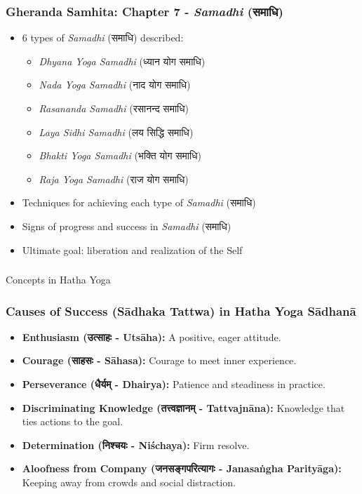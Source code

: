\begin{frame}[fragile]\frametitle{Gheranda Samhita: Chapter 7 - \textit{Samadhi} (समाधि)}
\begin{itemize}
    \item 6 types of \textit{Samadhi} (समाधि) described:
    \begin{itemize}
        \item \textit{Dhyana Yoga Samadhi} (ध्यान योग समाधि)
        \item \textit{Nada Yoga Samadhi} (नाद योग समाधि)
        \item \textit{Rasananda Samadhi} (रसानन्द समाधि)
        \item \textit{Laya Sidhi Samadhi} (लय सिद्धि समाधि)
        \item \textit{Bhakti Yoga Samadhi} (भक्ति योग समाधि)
        \item \textit{Raja Yoga Samadhi} (राज योग समाधि)
    \end{itemize}
    \item Techniques for achieving each type of \textit{Samadhi} (समाधि)
    \item Signs of progress and success in \textit{Samadhi} (समाधि)
    \item Ultimate goal: liberation and realization of the Self
\end{itemize}
\end{frame}



\begin{frame}[fragile]\frametitle{}
\begin{center}
{\Large Concepts in Hatha Yoga}
\end{center}
\end{frame}

\begin{frame}[fragile]\frametitle{Causes of Success (Sādhaka Tattwa) in Hatha Yoga Sādhanā}
\begin{itemize}
    \item \textbf{Enthusiasm (उत्साहः - Utsāha):} A positive, eager attitude.
    \item \textbf{Courage (साहसः - Sāhasa):} Courage to meet inner experience.
    \item \textbf{Perseverance (धैर्यम् - Dhairya):} Patience and steadiness in practice.
    \item \textbf{Discriminating Knowledge (तत्त्वज्ञानम् - Tattvajnāna):} Knowledge that ties actions to the goal.
    \item \textbf{Determination (निश्चयः - Niśchaya):} Firm resolve.
    \item \textbf{Aloofness from Company (जनसङ्गपरित्यागः - Janasaṅgha Parityāga):} Keeping away from crowds and social distraction.
\end{itemize}
\end{frame}

